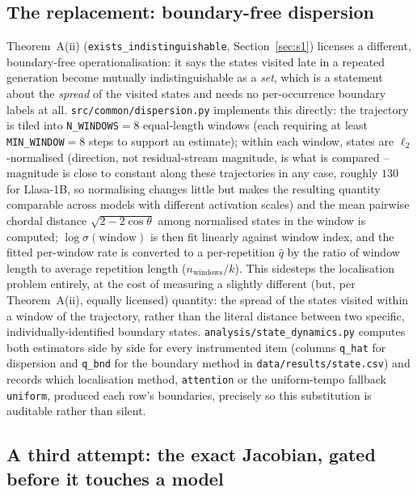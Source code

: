 \documentclass[11pt]{article}
\begin{document}
\subsection{The replacement: boundary-free dispersion}
\label{sec:s5-replacement}

Theorem~A(ii) (\texttt{exists\_indistinguishable}, Section~\ref{sec:s1})
licenses a different, boundary-free operationalisation: it says the states
visited late in a repeated generation become mutually indistinguishable as a
\emph{set}, which is a statement about the \emph{spread} of the visited
states and needs no per-occurrence boundary labels at all.
\texttt{src/common/dispersion.py} implements this directly: the trajectory is
tiled into \texttt{N\_WINDOWS}$=8$ equal-length windows (each requiring at
least \texttt{MIN\_WINDOW}$=8$ steps to support an estimate); within each
window, states are $\ell_2$-normalised (direction, not residual-stream
magnitude, is what is compared -- magnitude is close to constant along these
trajectories in any case, roughly $130$ for Llasa-1B, so normalising changes
little but makes the resulting quantity comparable across models with
different activation scales) and the mean pairwise chordal distance
$\sqrt{2-2\cos\theta}$ among normalised states in the window is computed;
$\log\sigma(\text{window})$ is then fit linearly against window index, and
the fitted per-window rate is converted to a per-repetition $\hat q$ by the
ratio of window length to average repetition length ($n_{\text{windows}}/k$).
This sidesteps the localisation problem entirely, at the cost of measuring a
slightly different (but, per Theorem~A(ii), equally licensed) quantity: the
spread of the states visited within a window of the trajectory, rather than
the literal distance between two specific, individually-identified boundary
states. \texttt{analysis/state\_dynamics.py} computes both estimators side by
side for every instrumented item (columns \texttt{q\_hat} for dispersion and
\texttt{q\_bnd} for the boundary method in
\texttt{data/results/state.csv}) and records which localisation method,
\texttt{attention} or the uniform-tempo fallback \texttt{uniform}, produced
each row's boundaries, precisely so this substitution is auditable rather
than silent.

\subsection{A third attempt: the exact Jacobian, gated before it touches a model}
\label{sec:s5-jacobian}
\end{document}
